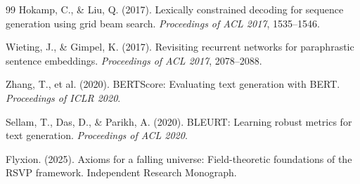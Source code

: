 \documentclass[12pt, a4paper]{article}
\theoremstyle{plain}
\theoremstyle{definition}
\theoremstyle{remark}
\begin{document}
\begin{thebibliography}{99}
Hokamp, C., \& Liu, Q. (2017).
\newblock Lexically constrained decoding for sequence generation using grid
  beam search.
\newblock \emph{Proceedings of ACL 2017}, 1535--1546.

Wieting, J., \& Gimpel, K. (2017).
\newblock Revisiting recurrent networks for paraphrastic sentence embeddings.
\newblock \emph{Proceedings of ACL 2017}, 2078--2088.


Zhang, T., et al. (2020).
\newblock BERTScore: Evaluating text generation with BERT.
\newblock \emph{Proceedings of ICLR 2020}.

Sellam, T., Das, D., \& Parikh, A. (2020).
\newblock BLEURT: Learning robust metrics for text generation.
\newblock \emph{Proceedings of ACL 2020}.


Flyxion. (2025).
\newblock Axioms for a falling universe: Field-theoretic foundations of the
  RSVP framework.
\newblock Independent Research Monograph.

\end{thebibliography}
\end{document}
